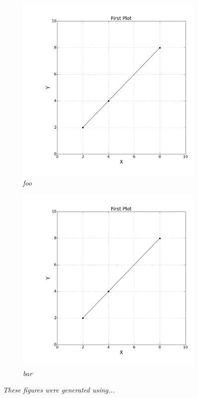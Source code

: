 \documentclass[11pt]{article}
\begin{document}
\begin{figure}[H]
\centering
  \begin{subfigure}{.5\textwidth}
    \centering
      \includegraphics[width=1\linewidth]{../Python/LinePlot/lp.png}
      \caption{\it \small{foo}}
        \label{fig:na4}
  \end{subfigure}%
  \begin{subfigure}{.5\textwidth}
    \centering
      \includegraphics[width=1\linewidth]{../Python/LinePlot/lp.png}
      \caption{\it \small{bar}}
        \label{fig:na10}
  \end{subfigure}
  \caption{\it \small{These figures were generated using...}}
    \label{fig:na04-10}
\end{figure}
\end{document}
